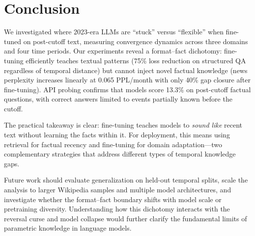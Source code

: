 \section{Conclusion}
\label{sec:conclusion}

We investigated where 2023-era LLMs are ``stuck'' versus ``flexible'' when fine-tuned on post-cutoff text, measuring convergence dynamics across three domains and four time periods. Our experiments reveal a format--fact dichotomy: fine-tuning efficiently teaches textual patterns (75\% loss reduction on structured QA regardless of temporal distance) but cannot inject novel factual knowledge (news perplexity increases linearly at 0.065 PPL/month with only 40\% gap closure after fine-tuning). API probing confirms that models score 13.3\% on post-cutoff factual questions, with correct answers limited to events partially known before the cutoff.

The practical takeaway is clear: fine-tuning teaches models to \emph{sound like} recent text without learning the facts within it. For deployment, this means using retrieval for factual recency and fine-tuning for domain adaptation---two complementary strategies that address different types of temporal knowledge gaps.

Future work should evaluate generalization on held-out temporal splits, scale the analysis to larger Wikipedia samples and multiple model architectures, and investigate whether the format--fact boundary shifts with model scale or pretraining diversity. Understanding how this dichotomy interacts with the reversal curse \citep{berglund2024reversal} and model collapse \citep{shumailov2023curse} would further clarify the fundamental limits of parametric knowledge in language models.
